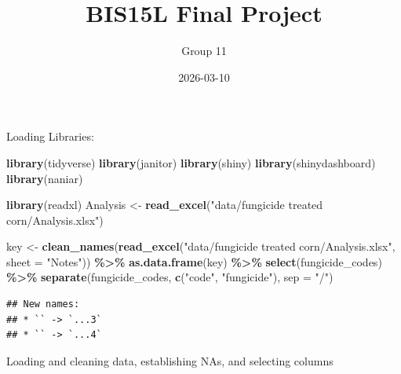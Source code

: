 \documentclass[
]{article}
\title{BIS15L Final Project}
\author{Group 11}
\date{2026-03-10}
\newenvironment{Shaded}{\begin{snugshade}}{\end{snugshade}}
\newcommand{\AttributeTok}[1]{\textcolor[rgb]{0.13,0.29,0.53}{#1}}
\newcommand{\FunctionTok}[1]{\textcolor[rgb]{0.13,0.29,0.53}{\textbf{#1}}}
\newcommand{\NormalTok}[1]{#1}
\newcommand{\OtherTok}[1]{\textcolor[rgb]{0.56,0.35,0.01}{#1}}
\newcommand{\SpecialCharTok}[1]{\textcolor[rgb]{0.81,0.36,0.00}{\textbf{#1}}}
\newcommand{\StringTok}[1]{\textcolor[rgb]{0.31,0.60,0.02}{#1}}
\begin{document}
\maketitle

Loading Libraries:

\begin{Shaded}
\begin{Highlighting}[]
\FunctionTok{library}\NormalTok{(tidyverse)}
\FunctionTok{library}\NormalTok{(janitor)}
\FunctionTok{library}\NormalTok{(shiny)}
\FunctionTok{library}\NormalTok{(shinydashboard)}
\FunctionTok{library}\NormalTok{(naniar)}
\end{Highlighting}
\end{Shaded}

\begin{Shaded}
\begin{Highlighting}[]
\FunctionTok{library}\NormalTok{(readxl)}
\NormalTok{Analysis }\OtherTok{\textless{}{-}} \FunctionTok{read\_excel}\NormalTok{(}\StringTok{"data/fungicide treated corn/Analysis.xlsx"}\NormalTok{)}


\NormalTok{key }\OtherTok{\textless{}{-}} \FunctionTok{clean\_names}\NormalTok{(}\FunctionTok{read\_excel}\NormalTok{(}\StringTok{"data/fungicide treated corn/Analysis.xlsx"}\NormalTok{, }\AttributeTok{sheet =} \StringTok{"Notes"}\NormalTok{)) }\SpecialCharTok{\%\textgreater{}\%} 
  \FunctionTok{as.data.frame}\NormalTok{(key) }\SpecialCharTok{\%\textgreater{}\%} 
  \FunctionTok{select}\NormalTok{(fungicide\_codes) }\SpecialCharTok{\%\textgreater{}\%} 
  \FunctionTok{separate}\NormalTok{(fungicide\_codes, }\FunctionTok{c}\NormalTok{(}\StringTok{"code"}\NormalTok{, }\StringTok{"fungicide"}\NormalTok{), }\AttributeTok{sep =} \StringTok{"/"}\NormalTok{)}
\end{Highlighting}
\end{Shaded}

\begin{verbatim}
## New names:
## * `` -> `...3`
## * `` -> `...4`
\end{verbatim}

Loading and cleaning data, establishing NAs, and selecting columns
\end{document}
